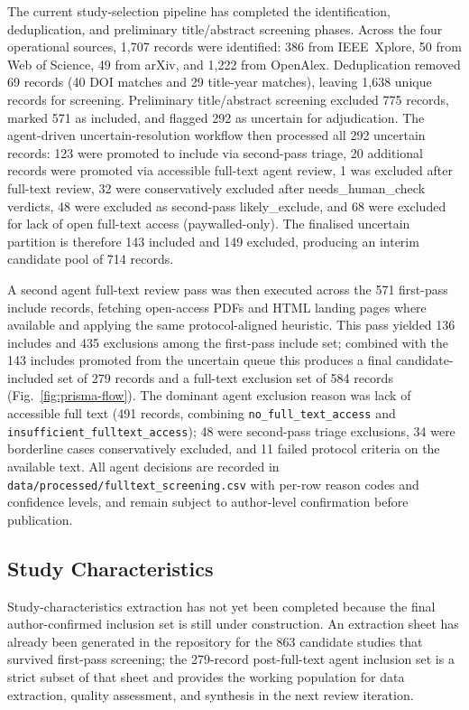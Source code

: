 \documentclass[journal]{IEEEtran}
\begin{document}
The current study-selection pipeline has completed the identification, deduplication, and preliminary title/abstract screening phases.
Across the four operational sources, 1,707 records were identified: 386 from IEEE~Xplore, 50 from Web of Science, 49 from arXiv, and 1,222 from OpenAlex.
Deduplication removed 69 records (40 DOI matches and 29 title-year matches), leaving 1,638 unique records for screening.
Preliminary title/abstract screening excluded 775 records, marked 571 as included, and flagged 292 as uncertain for adjudication.
The agent-driven uncertain-resolution workflow then processed all 292 uncertain records: 123 were promoted to include via second-pass triage, 20 additional records were promoted via accessible full-text agent review, 1 was excluded after full-text review, 32 were conservatively excluded after needs\_human\_check verdicts, 48 were excluded as second-pass likely\_exclude, and 68 were excluded for lack of open full-text access (paywalled-only).
The finalised uncertain partition is therefore 143 included and 149 excluded, producing an interim candidate pool of 714 records.

A second agent full-text review pass was then executed across the 571 first-pass include records, fetching open-access PDFs and HTML landing pages where available and applying the same protocol-aligned heuristic.
This pass yielded 136 includes and 435 exclusions among the first-pass include set; combined with the 143 includes promoted from the uncertain queue this produces a final candidate-included set of 279 records and a full-text exclusion set of 584 records (Fig.~\ref{fig:prisma-flow}).
The dominant agent exclusion reason was lack of accessible full text (491 records, combining \texttt{no\_full\_text\_access} and \texttt{insufficient\_fulltext\_access}); 48 were second-pass triage exclusions, 34 were borderline cases conservatively excluded, and 11 failed protocol criteria on the available text.
All agent decisions are recorded in \texttt{data/processed/fulltext\_screening.csv} with per-row reason codes and confidence levels, and remain subject to author-level confirmation before publication.



\subsection{Study Characteristics}

Study-characteristics extraction has not yet been completed because the final author-confirmed inclusion set is still under construction.
An extraction sheet has already been generated in the repository for the 863 candidate studies that survived first-pass screening; the 279-record post-full-text agent inclusion set is a strict subset of that sheet and provides the working population for data extraction, quality assessment, and synthesis in the next review iteration.
\end{document}
